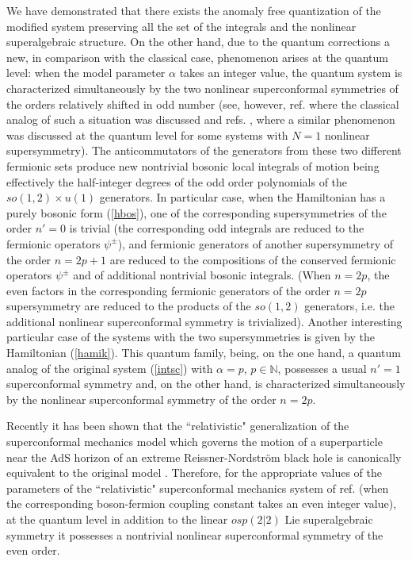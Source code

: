 \documentclass[a4paper,12pt]{article}
\def\N{\mathbb N}
\begin{document}
We have demonstrated that there exists
the anomaly free
quantization
of the modified system preserving
all the set of the integrals
and the nonlinear superalgebraic structure.
On the other hand,
due to the quantum corrections a new,
in comparison with the classical case,
phenomenon arises at the quantum level:
when the model parameter $\alpha$ takes an integer value,
the quantum system is characterized
simultaneously by the two nonlinear
superconformal symmetries of the orders relatively
shifted in odd number
(see, however, ref. \cite{KP1} where the classical
analog of such a situation was discussed
and refs. \cite{ACIN,AS}, where a similar phenomenon
was discussed at the quantum level for
some systems with $N=1$ nonlinear supersymmetry).
The anticommutators of
the generators from these two different fermionic sets
produce new nontrivial bosonic local integrals of
motion being effectively
the half-integer degrees of the
odd order polynomials
of the
$so(1,2)\times u(1)$
generators.
In particular case, when the Hamiltonian has a purely
bosonic form (\ref{hbos}),
one of the corresponding supersymmetries
of the order $n'=0$ is trivial
 (the corresponding odd integrals
are reduced to the  fermionic operators $\psi^\pm$),
and fermionic generators of another supersymmetry
of the order $n=2p+1$ are
reduced to the  compositions of the
conserved fermionic operators $\psi^\pm$
and of additional nontrivial bosonic integrals.
(When $n=2p$, the even factors in the corresponding
fermionic generators of
the order $n=2p$ supersymmetry are
reduced to the products of the $so(1,2)$ generators,
i.e. the additional nonlinear superconformal symmetry
is trivialized).
Another interesting particular case of the
systems with the two supersymmetries is given
by the Hamiltonian (\ref{hamik}).
This quantum family,
being, on the one hand, a quantum analog of the
original system
(\ref{intsc}) with $\alpha=p$, $p\in \N$,
possesses a usual $n'=1$
superconformal symmetry and, on the other hand,
is characterized simultaneously  by the
nonlinear superconformal symmetry of
the order $n=2p$.

Recently it has been shown \cite{Kum,CKZ,CCM,Iva2}
that the ``relativistic" generalization
of the superconformal mechanics model
which  governs the motion of a superparticle
near the AdS  horizon of an extreme
Reissner-Nordstr\"om black hole \cite{BH}
is canonically equivalent to the original model
\cite{AP,FR}.
Therefore, for the appropriate values
of the parameters of the ``relativistic"
superconformal mechanics system of ref.
\cite{BH}
(when the corresponding boson-fermion coupling constant
takes an even integer value), at the quantum level
in addition to the linear $osp(2|2)$
Lie superalgebraic symmetry
it possesses a nontrivial nonlinear superconformal
symmetry of the even order.
\end{document}
